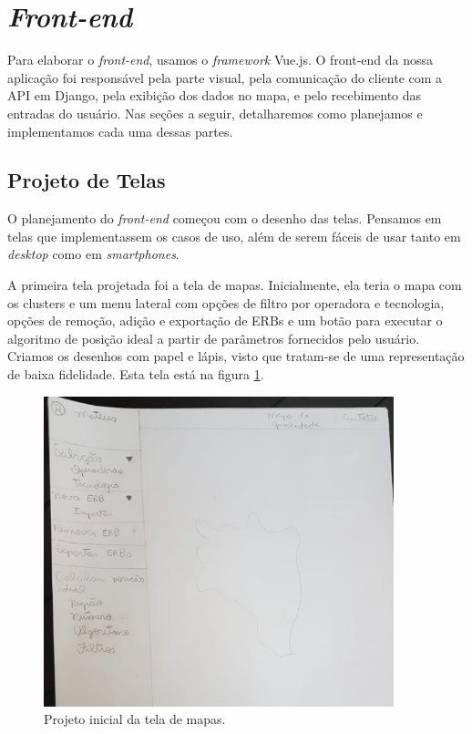 \documentclass[]{politex}
\begin{document}
\section{\textit{Front-end}}
Para elaborar o \textit{front-end}, usamos o \textit{framework} Vue.js.
O front-end da nossa aplicação foi responsável pela parte visual, pela
comunicação do cliente com a API em Django, pela exibição dos dados no mapa,
e pelo recebimento das entradas do usuário. Nas seções a seguir, detalharemos
como planejamos e implementamos cada uma dessas partes.

\subsection{Projeto de Telas}
O planejamento do \textit{front-end} começou com o desenho das telas. Pensamos em telas
que implementassem os casos de uso, além de serem fáceis de usar tanto em \textit{desktop}
como em \textit{smartphones}.

A primeira tela projetada foi a tela de mapas. Inicialmente,
ela teria o mapa com os clusters e um menu lateral com opções de filtro por
operadora e tecnologia, opções de remoção, adição e exportação de ERBs e um
botão para executar o algoritmo de posição ideal a partir de parâmetros fornecidos
pelo usuário. Criamos os desenhos com papel e lápis, visto que tratam-se de uma
representação de baixa fidelidade. Esta tela está na figura \ref{fig:rascunho_mapa}.

\begin{figure}[H]
    \centering
    \includegraphics[width=4in]{imagens/rascunho-mapa}
    \caption{Projeto inicial da tela de mapas.}
    \label{fig:rascunho_mapa}
\end{figure}
\end{document}
